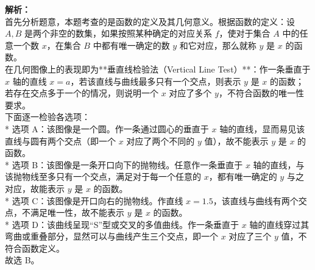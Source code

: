 \documentclass[12pt,a4paper]{exam-zh}
\begin{document}
\begin{solution}
    \textbf{解析：} \\
    首先分析题意，本题考查的是函数的定义及其几何意义。根据函数的定义：设 $A, B$ 是两个非空的数集，如果按照某种确定的对应关系 $f$，使对于集合 $A$ 中的任意一个数 $x$，在集合 $B$ 中都有唯一确定的数 $y$ 和它对应，那么就称 $y$ 是 $x$ 的函数。 \\
    在几何图像上的表现即为**垂直线检验法（Vertical Line Test）**：作一条垂直于 $x$ 轴的直线 $x = a$，若该直线与曲线最多只有一个交点，则表示 $y$ 是 $x$ 的函数；若存在交点多于一个的情况，则说明一个 $x$ 对应了多个 $y$，不符合函数的唯一性要求。 \\
    
    下面逐一检验各选项： \\
    * 选项 A：该图像是一个圆。作一条通过圆心的垂直于 $x$ 轴的直线，显而易见该直线与圆有两个交点（即一个 $x$ 对应了两个不同的 $y$ 值），故不能表示 $y$ 是 $x$ 的函数。 \\
    * 选项 B：该图像是一条开口向下的抛物线。任意作一条垂直于 $x$ 轴的直线，与该抛物线至多只有一个交点，满足对于每一个任意的 $x$，都有唯一确定的 $y$ 与之对应，故能表示 $y$ 是 $x$ 的函数。 \\
    * 选项 C：该图像是开口向右的抛物线。作直线 $x = 1.5$，该直线与曲线有两个交点，不满足唯一性，故不能表示 $y$ 是 $x$ 的函数。 \\
    * 选项 D：该曲线呈现“S”型或交叉的多值曲线。作一条垂直于 $x$ 轴的直线穿过其弯曲或重叠部分，显然可以与曲线产生三个交点，即一个 $x$ 对应了三个 $y$ 值，不符合函数定义。 \\
    故选 B。
\end{solution}
\end{document}
